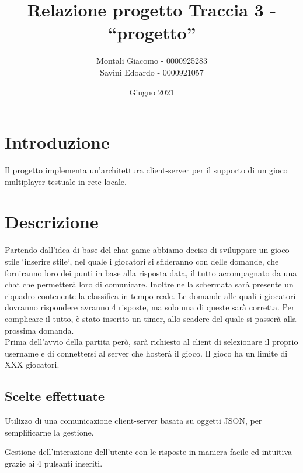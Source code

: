 \documentclass[a4paper,12pt]{report}
\title{\textbf{Relazione progetto} \break Traccia 3 - ``progetto''}
\author{Montali Giacomo - 0000925283 \\ Savini Edoardo - 0000921057}
\date{Giugno 2021}
\begin{document}
	\maketitle
	{\fontsize{14}{20}\selectfont
		\chapter{Introduzione}
			Il progetto implementa un’architettura client-server per il supporto di un gioco multiplayer testuale in rete locale.
			
		\chapter{Descrizione}
			Partendo dall'idea di base del chat game abbiamo deciso di sviluppare un gioco stile `inserire stile`, nel quale i giocatori si sfideranno con delle domande, che forniranno loro dei punti in base alla risposta data, il tutto accompagnato da una chat che permetterà loro di comunicare.
			Inoltre nella schermata sarà presente un riquadro contenente la classifica in tempo reale. 
			Le domande alle quali i giocatori dovranno rispondere avranno 4 risposte, ma solo una di queste sarà corretta. Per complicare il tutto, è stato inserito un timer, allo scadere del quale si passerà alla prossima domanda. \\
			Prima dell'avvio della partita però, sarà richiesto al client di selezionare il proprio username e di connettersi al server che hosterà il gioco.
			Il gioco ha un limite di XXX giocatori.
			
			\section{Scelte effettuate}
				\begin{description}[font=$\bullet$~\normalfont\scshape\color{red!90!black}]
					\item Utilizzo di una comunicazione client-server basata su oggetti JSON,
					per semplificarne la gestione.
					
					\item Gestione dell'interazione dell'utente con le risposte in maniera facile ed intuitiva grazie ai 4 pulsanti inseriti.
					
					\item 
					
					\item
				\end{description}
		
}
\end{document}
